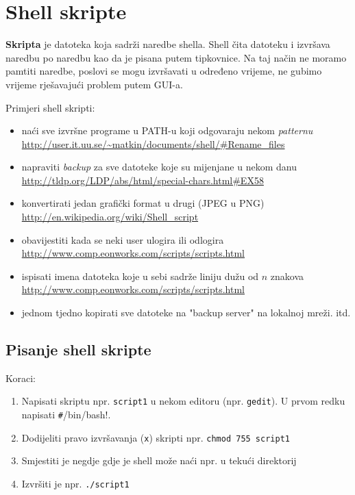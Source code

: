 \section{Shell skripte}

\textbf{Skripta} je datoteka koja sadrži naredbe shella. Shell čita datoteku i izvršava naredbu po naredbu kao da je pisana putem tipkovnice. Na taj način ne moramo pamtiti naredbe, poslovi se mogu izvršavati u određeno vrijeme, ne gubimo vrijeme rješavajući problem putem GUI-a.

\begin{primjer} Primjeri shell skripti: 
\begin{itemize}
\item  naći sve izvršne programe u PATH-u koji odgovaraju nekom \textit{patternu} \url{http://user.it.uu.se/~matkin/documents/shell/#Rename_files}
\item  napraviti \textit{backup} za sve datoteke koje su mijenjane u nekom danu \url{http://tldp.org/LDP/abs/html/special-chars.html#EX58}
\item  konvertirati jedan grafički format u drugi (JPEG u PNG) \url{http://en.wikipedia.org/wiki/Shell_script}
\item  obavijestiti kada se neki user ulogira ili odlogira \url{http://www.comp.eonworks.com/scripts/scripts.html}
\item ispisati imena datoteka koje u sebi sadrže liniju dužu od $n$ znakova \url{http://www.comp.eonworks.com/scripts/scripts.html}
\item jednom tjedno kopirati sve datoteke na "backup server" na lokalnoj mreži.
itd.
\end{itemize}
\end{primjer}

\subsection*{Pisanje shell skripte}
Koraci:
\begin{enumerate}
 \item Napisati skriptu npr. \texttt{script1} u nekom editoru (npr. \texttt{gedit}). U prvom redku napisati \lstinline!#!/bin/bash!.
\item Dodijeliti pravo izvršavanja (\texttt{x}) skripti npr. \lstinline!chmod 755 script1!
\item Smjestiti je negdje gdje je shell može naći npr. u tekući direktorij 
\item Izvršiti je npr. \texttt{./script1}
\end{enumerate}

